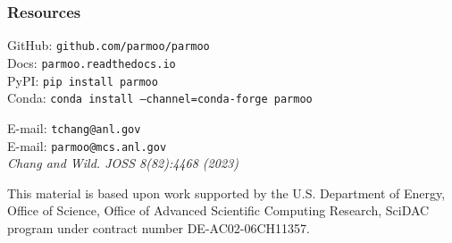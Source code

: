 \documentclass[aspectratio=169]{beamer}
\begin{document}
\begin{frame}\frametitle{Resources}
\begin{center}
{\large
GitHub: {\tt github.com/parmoo/parmoo}\\
Docs: {\tt parmoo.readthedocs.io}\\
PyPI: {\tt pip install parmoo}\\
Conda: {\tt conda install --channel=conda-forge parmoo}}

\bigskip
\bigskip

E-mail: {\tt tchang@anl.gov}\\
E-mail: {\tt parmoo@mcs.anl.gov}\\
\bigskip
\bigskip
{\sl Chang and Wild. JOSS 8(82):4468 (2023)}\\

\vfill

{\tiny This material is based upon work supported by the U.S. Department of Energy, Office of Science, Office of Advanced Scientific Computing Research, SciDAC program under contract number DE-AC02-06CH11357.\\}

\end{center}
\end{frame}
\end{document}
